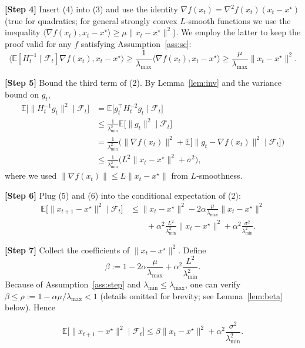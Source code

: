 \documentclass[11pt]{article}
\newcommand{\E}{\mathbb{E}}
\begin{document}
\noindent\textbf{[Step 4]} Insert (4) into (3) and use the identity  
$\nabla f(x_{t}) = \nabla^{2}f(x_{t})(x_{t}-x^{\star})$ (true for quadratics; for general strongly convex $L$‑smooth functions we use the inequality
$\langle \nabla f(x_{t}),x_{t}-x^{\star}\rangle\ge\mu\|x_{t}-x^{\star}\|^{2}$).  
We employ the latter to keep the proof valid for any $f$ satisfying Assumption~\ref{ass:sc}:
\[
\langle \E[H_{t}^{-1}\mid\mathcal{F}_{t}]\nabla f(x_{t}),x_{t}-x^{\star}\rangle
\ge \frac{1}{\lambda_{\max}}\langle \nabla f(x_{t}),x_{t}-x^{\star}\rangle
\ge \frac{\mu}{\lambda_{\max}}\|x_{t}-x^{\star}\|^{2}.
\tag{5}
\]

\noindent\textbf{[Step 5]} Bound the third term of (2). By Lemma~\ref{lem:inv} and the variance bound on $g_{t}$,
\[
\begin{aligned}
\E\big[\|H_{t}^{-1}g_{t}\|^{2}\mid\mathcal{F}_{t}\big]
&= \E\big[g_{t}^{\top}H_{t}^{-2}g_{t}\mid\mathcal{F}_{t}\big]\\
&\le \frac{1}{\lambda_{\min}^{2}}\E\big[\|g_{t}\|^{2}\mid\mathcal{F}_{t}\big]\\
&= \frac{1}{\lambda_{\min}^{2}}\big(\|\nabla f(x_{t})\|^{2}
     +\E\!\big[\|g_{t}-\nabla f(x_{t})\|^{2}\mid\mathcal{F}_{t}\big]\big)\\
&\le \frac{1}{\lambda_{\min}^{2}}\big(L^{2}\|x_{t}-x^{\star}\|^{2}+\sigma^{2}\big),
\end{aligned}
\tag{6}
\]
where we used $ \|\nabla f(x_{t})\|\le L\|x_{t}-x^{\star}\| $ from $L$‑smoothness.

\noindent\textbf{[Step 6]} Plug (5) and (6) into the conditional expectation of (2):
\[
\begin{aligned}
\E\!\big[\|x_{t+1}-x^{\star}\|^{2}\mid\mathcal{F}_{t}\big]
&\le \|x_{t}-x^{\star}\|^{2}
   -2\alpha\frac{\mu}{\lambda_{\max}}\|x_{t}-x^{\star}\|^{2}\\
&\qquad +\alpha^{2}\frac{L^{2}}{\lambda_{\min}^{2}}\|x_{t}-x^{\star}\|^{2}
   +\alpha^{2}\frac{\sigma^{2}}{\lambda_{\min}^{2}}.
\end{aligned}
\tag{7}
\]

\noindent\textbf{[Step 7]} Collect the coefficients of $\|x_{t}-x^{\star}\|^{2}$.
Define
\[
\beta:=1-2\alpha\frac{\mu}{\lambda_{\max}}
      +\alpha^{2}\frac{L^{2}}{\lambda_{\min}^{2}}.
\tag{8}
\]
Because of Assumption~\ref{ass:step} and $\lambda_{\min}\le\lambda_{\max}$,
one can verify $\beta\le\rho:=1-\alpha\mu/\lambda_{\max}<1$ (details omitted for brevity; see Lemma~\ref{lem:beta} below). Hence

\[
\E\!\big[\|x_{t+1}-x^{\star}\|^{2}\mid\mathcal{F}_{t}\big]
\le \beta\|x_{t}-x^{\star}\|^{2}
    +\alpha^{2}\frac{\sigma^{2}}{\lambda_{\min}^{2}}.
\tag{9}
\]
\end{document}
